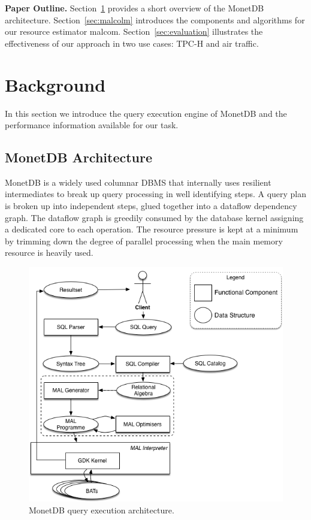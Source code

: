\documentclass[conference]{IEEEtran}
\def\Skip{\par\medskip\nobreak\noindent}
\begin{document}
\Skip
\textbf{Paper Outline.}
Section~\ref{sec:background} provides a short overview of the MonetDB architecture.%
Section~\ref{sec:malcolm} introduces the components and algorithms for our resource estimator {\sc malcom}.
Section~\ref{sec:evaluation} illustrates the effectiveness of our approach in two use cases: TPC-H and air traffic.

\section{Background}
\label{sec:background} 
In this section we introduce the query execution engine of MonetDB and the performance information available for our task.

\subsection{MonetDB Architecture}
MonetDB is a widely used columnar DBMS that internally uses resilient intermediates to break up query processing in well identifying steps. 
A query plan is broken up into independent steps, glued together into a dataflow dependency graph.
The dataflow graph is greedily consumed by the database kernel assigning a dedicated core to each operation.
The resource pressure is kept at a minimum by trimming down the degree of parallel processing when the main memory resource is heavily used.

\begin{figure}[t]
    \centering\includegraphics[width=.95\columnwidth]{Figures/MDB_impl_arch.png}
    \caption{MonetDB query execution architecture.}
    \label{fig:mdb_arch}
\end{figure}
\end{document}
